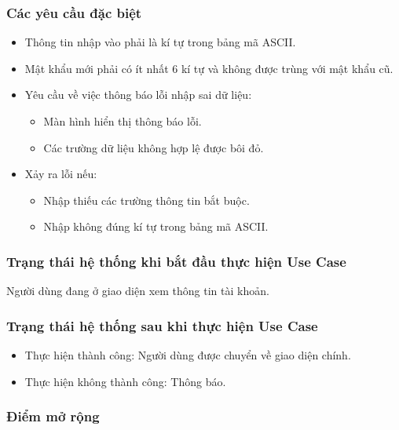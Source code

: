 \subsubsection{Các yêu cầu đặc biệt}
\begin{itemize}
    \item Thông tin nhập vào phải là kí tự trong bảng mã ASCII.
    \item Mật khẩu mới phải có ít nhất 6 kí tự và không được trùng với mật khẩu cũ.
    \item Yêu cầu về việc thông báo lỗi nhập sai dữ liệu:
    \begin{itemize}
        \item Màn hình hiển thị thông báo lỗi.
        \item Các trường dữ liệu không hợp lệ được bôi đỏ.
    \end{itemize}
    \item Xảy ra lỗi nếu:
    \begin{itemize}
        \item Nhập thiếu các trường thông tin bắt buộc.
        \item Nhập không đúng kí tự trong bảng mã ASCII.
    \end{itemize}
\end{itemize}

\subsubsection{Trạng thái hệ thống khi bắt đầu thực hiện Use Case}
Người dùng đang ở giao diện xem thông tin tài khoản.

\subsubsection{Trạng thái hệ thống sau khi thực hiện Use Case}
\begin{itemize}
    \item Thực hiện thành công: Người dùng được chuyển về giao diện chính.
    \item Thực hiện không thành công: Thông báo.
\end{itemize}

\subsubsection{Điểm mở rộng}